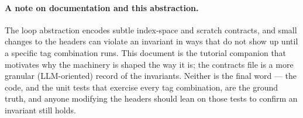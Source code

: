 \documentclass[11pt]{article}
\begin{document}
\paragraph{A note on documentation and this abstraction.} The loop abstraction
encodes subtle index-space and scratch contracts, and small changes to the headers
can violate an invariant in ways that do not show up until a specific tag
combination runs. This document is the tutorial companion that motivates why the
machinery is shaped the way it is; the contracts file is a more granular
(LLM-oriented) record of the invariants. Neither is the final word --- the code,
and the unit tests that exercise every tag combination, are the ground truth, and
anyone modifying the headers should lean on those tests to confirm an invariant
still holds.
\end{document}
